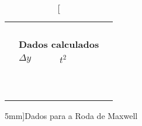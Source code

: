 \begin{table*}[!ht]
\begin{tabular}{lp{25mm}p{25mm}p{25mm}l}
        & \cellcolor[gray]{0.95} & \cellcolor[gray]{0.97} & \cellcolor[gray]{0.95} \\
        & \cellcolor[gray]{0.89} & \cellcolor[gray]{0.92} & \cellcolor[gray]{0.89} \\
        & \cellcolor[gray]{0.95} & \cellcolor[gray]{0.97} & \cellcolor[gray]{0.95} \\
        \cmidrule{2-4}
    \\
        & \multicolumn{3}{l}{\textbf{Dados calculados}} \\
        \cmidrule{2-3}
        & $\Delta y$ & $t^2$ \\
        \cmidrule{2-3}
        & \cellcolor[gray]{0.89} & \cellcolor[gray]{0.92} \\ 
        & \cellcolor[gray]{0.95} & \cellcolor[gray]{0.97} \\ 
        & \cellcolor[gray]{0.89} & \cellcolor[gray]{0.92} \\ 
        & \cellcolor[gray]{0.95} & \cellcolor[gray]{0.97} \\ 
        & \cellcolor[gray]{0.89} & \cellcolor[gray]{0.92} \\ 
        & \cellcolor[gray]{0.95} & \cellcolor[gray]{0.97} \\ 
        & \cellcolor[gray]{0.89} & \cellcolor[gray]{0.92} \\ 
        & \cellcolor[gray]{0.95} & \cellcolor[gray]{0.97} \\ 
        & \cellcolor[gray]{0.89} & \cellcolor[gray]{0.92} \\ 
        & \cellcolor[gray]{0.95} & \cellcolor[gray]{0.97} \\ 
        \cmidrule{2-3}
    \bottomrule
    \end{tabular}
    \caption[][5mm]{Dados para a Roda de Maxwell}
    \label{DadosRodaDeMaxwell}
    \end{table*}
